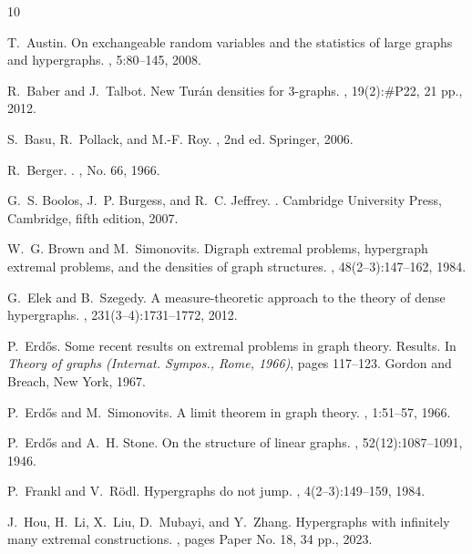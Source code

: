 \documentclass[10pt]{article}
\numberwithin{equation}{section}
\theoremstyle{definition}
\begin{document}
\begin{thebibliography}{10}

T.~Austin.
\newblock On exchangeable random variables and the statistics of large graphs
  and hypergraphs.
, 5:80--145, 2008.

R.~Baber and J.~Talbot.
\newblock New {T}ur{\'a}n densities for {$3$}-graphs.
, 19(2):\#P22, 21 pp., 2012.

S.~Basu, R.~Pollack, and M.-F. Roy.
, 2nd ed.
\newblock Springer, 2006.

R.~Berger.
.
, No. 66, 1966.

G.~S. Boolos, J.~P. Burgess, and R.~C. Jeffrey.
.
\newblock Cambridge University Press, Cambridge, fifth edition, 2007.

W.~G. Brown and M.~Simonovits.
\newblock Digraph extremal problems, hypergraph extremal problems, and the
  densities of graph structures.
, 48(2--3):147--162, 1984.

G.~Elek and B.~Szegedy.
\newblock A measure-theoretic approach to the theory of dense hypergraphs.
, 231(3--4):1731--1772, 2012.

P.~Erd{\H{o}}s.
\newblock Some recent results on extremal problems in graph theory. {R}esults.
\newblock In {\em Theory of graphs (Internat. Sympos., Rome, 1966)}, pages
  117--123. Gordon and Breach, New York, 1967.

P.~Erd{\H{o}}s and M.~Simonovits.
\newblock A limit theorem in graph theory.
, 1:51--57, 1966.

P.~Erd{\H{o}}s and A.~H. Stone.
\newblock On the structure of linear graphs.
, 52(12):1087--1091, 1946.

P.~Frankl and V.~R{\"o}dl.
\newblock Hypergraphs do not jump.
, 4(2--3):149--159, 1984.

J.~Hou, H.~Li, X.~Liu, D.~Mubayi, and Y.~Zhang.
\newblock Hypergraphs with infinitely many extremal constructions.
, pages Paper No. 18, 34 pp., 2023.


\end{thebibliography}
\end{document}
